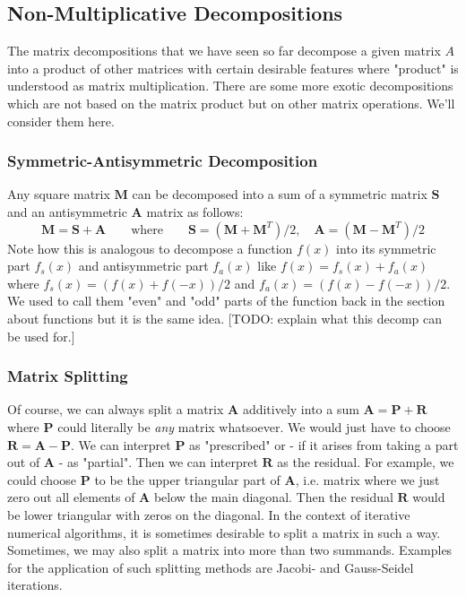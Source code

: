 \subsection{Non-Multiplicative Decompositions}
The matrix decompositions that we have seen so far decompose a given matrix $A$ into a product of other matrices with certain desirable features where "product" is understood as matrix multiplication. There are some more exotic decompositions which are not based on the matrix product but on other matrix operations. We'll consider them here.

\subsubsection{Symmetric-Antisymmetric Decomposition}
Any square matrix $\mathbf{M}$ can be decomposed into a sum of a symmetric matrix $\mathbf{S}$ and an antisymmetric $\mathbf{A}$ matrix as follows:
\begin{equation}
\mathbf{M} = \mathbf{S + A} \qquad \text{where}  \qquad
\mathbf{S} = (\mathbf{M} + \mathbf{M}^T) / 2,  \quad
\mathbf{A} = (\mathbf{M} - \mathbf{M}^T) / 2
\end{equation}
Note how this is analogous to decompose a function $f(x)$ into its symmetric part $f_s(x)$ and antisymmetric part $f_a(x)$ like $f(x) = f_s(x) + f_a(x)$ where $f_s(x) = (f(x) + f(-x)) / 2$ and $f_a(x) = (f(x) - f(-x)) / 2$. We used to call them "even" and "odd" parts of the function back in the section about functions but it is the same idea. [TODO: explain what this decomp can be used for.]


\subsubsection{Matrix Splitting}
Of course, we can always split a matrix $\mathbf{A}$ additively into a sum $\mathbf{A} = \mathbf{P + R}$ where $\mathbf{P}$ could literally be \emph{any} matrix whatsoever. We would just have to choose $\mathbf{R} = \mathbf{A - P}$. We can interpret $\mathbf{P}$ as "prescribed" or - if it arises from taking a part out of $\mathbf{A}$ - as "partial". Then we can interpret $\mathbf{R}$ as the residual. For example, we could choose $\mathbf{P}$ to be the upper triangular part of $\mathbf{A}$, i.e. matrix where we just zero out all elements of $\mathbf{A}$ below the main diagonal. Then the residual $\mathbf{R}$ would be lower triangular with zeros on the diagonal. In the context of iterative numerical algorithms, it is sometimes desirable to split a matrix in such a way. Sometimes, we may also split a matrix into more than two summands. Examples for the application of such splitting methods are Jacobi- and Gauss-Seidel iterations.


